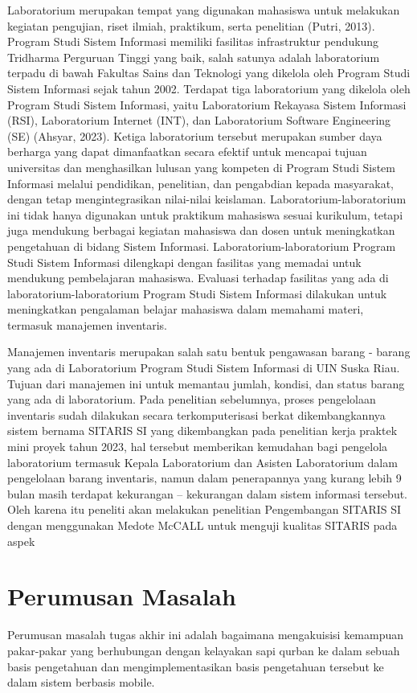 Laboratorium merupakan tempat yang digunakan mahasiswa untuk melakukan kegiatan pengujian, riset ilmiah, praktikum, serta penelitian (Putri, 2013). Program Studi Sistem Informasi memiliki fasilitas infrastruktur pendukung Tridharma Perguruan Tinggi yang baik, salah satunya adalah laboratorium terpadu di bawah Fakultas Sains dan Teknologi yang dikelola oleh Program Studi Sistem Informasi sejak tahun 2002. Terdapat tiga laboratorium yang dikelola oleh Program Studi Sistem Informasi, yaitu Laboratorium Rekayasa Sistem Informasi (RSI), Laboratorium Internet (INT), dan Laboratorium Software Engineering (SE) (Ahsyar, 2023). Ketiga laboratorium tersebut merupakan sumber daya berharga yang dapat dimanfaatkan secara efektif untuk mencapai tujuan universitas dan menghasilkan lulusan yang kompeten di Program Studi Sistem Informasi melalui pendidikan, penelitian, dan pengabdian kepada masyarakat, dengan tetap mengintegrasikan nilai-nilai keislaman. Laboratorium-laboratorium ini tidak hanya digunakan untuk praktikum mahasiswa sesuai kurikulum, tetapi juga mendukung berbagai kegiatan mahasiswa dan dosen untuk meningkatkan pengetahuan di bidang Sistem Informasi. Laboratorium-laboratorium Program Studi Sistem Informasi dilengkapi dengan fasilitas yang memadai untuk mendukung pembelajaran mahasiswa. Evaluasi terhadap fasilitas yang ada di laboratorium-laboratorium Program Studi Sistem Informasi dilakukan untuk meningkatkan pengalaman belajar mahasiswa dalam memahami materi, termasuk manajemen inventaris.

Manajemen inventaris merupakan salah satu bentuk pengawasan barang - barang yang ada di Laboratorium Program Studi Sistem Informasi di UIN Suska Riau. Tujuan dari manajemen ini untuk memantau jumlah, kondisi, dan status barang yang ada di laboratorium. Pada penelitian sebelumnya, proses pengelolaan inventaris sudah dilakukan secara terkomputerisasi berkat dikembangkannya sistem bernama SITARIS SI yang dikembangkan pada penelitian kerja praktek mini proyek tahun 2023, hal tersebut memberikan kemudahan bagi pengelola laboratorium termasuk Kepala Laboratorium dan Asisten Laboratorium dalam pengelolaan barang inventaris, namun dalam penerapannya yang kurang lebih 9 bulan masih terdapat kekurangan – kekurangan dalam sistem informasi tersebut. Oleh karena itu peneliti akan melakukan penelitian Pengembangan SITARIS SI dengan menggunakan Medote McCALL untuk menguji kualitas SITARIS pada aspek

\section{Perumusan Masalah}
Perumusan masalah tugas akhir ini adalah bagaimana mengakuisisi kemampuan pakar-pakar yang berhubungan dengan kelayakan sapi qurban ke dalam sebuah basis pengetahuan dan mengimplementasikan basis pengetahuan tersebut ke dalam sistem berbasis mobile.


